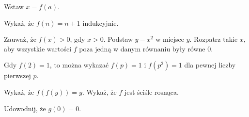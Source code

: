 
\begin{hints_list}
	\item Wstaw $x = f(a)$.
	\item Wykaż, że $f(n) = n + 1$ indukcyjnie.
	\item Zauważ, że $f(x) > 0 $, gdy $x > 0$. Podstaw $y - x^2$ w miejsce $y$. Rozpatrz takie $x$, aby wszystkie wartości $f$ poza jedną w danym równaniu były równe 0.
	\item Gdy $f(2) = 1$, to można wykazać $f(p) = 1$ i $f(p^2) = 1$ dla pewnej liczby pierwszej $p$.
	\item Wykaż, że $f(f(y)) = y$. Wykaż, że $f$ jest ściśle rosnąca.
	\item Udowodnij, że $g(0) = 0$.
\end{hints_list}
